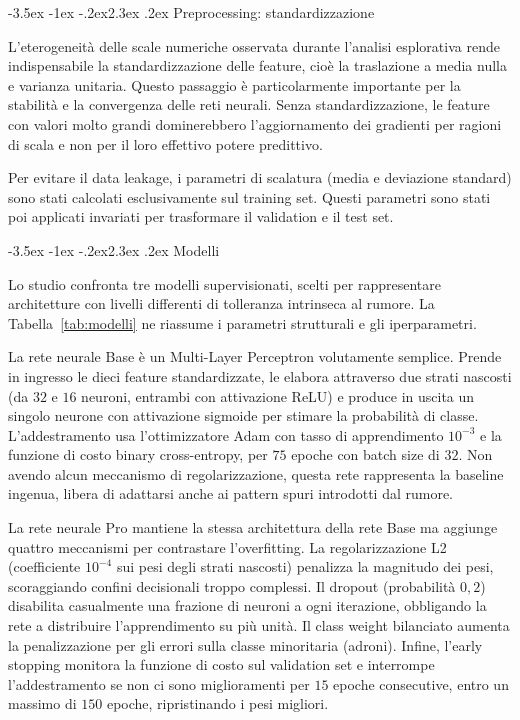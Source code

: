 \documentclass[12pt,a4paper]{article}
\makeatletter
\renewcommand\section{\@startsection{section}{1}{\z@}%
  {-3.5ex \@plus -1ex \@minus -.2ex}{2.3ex \@plus.2ex}%
  {\normalfont\Large\bfseries}}
\makeatother
\begin{document}
\section{Preprocessing: standardizzazione}\label{sec:prep}

L'eterogeneità delle scale numeriche osservata durante l'analisi esplorativa
rende indispensabile la standardizzazione delle feature, cioè la traslazione a
media nulla e varianza unitaria. Questo passaggio è particolarmente importante
per la stabilità e la convergenza delle reti neurali. Senza standardizzazione,
le feature con valori molto grandi dominerebbero l'aggiornamento dei gradienti
per ragioni di scala e non per il loro effettivo potere predittivo.

Per evitare il data leakage, i parametri di scalatura (media e deviazione
standard) sono stati calcolati esclusivamente sul training set. Questi parametri
sono stati poi applicati invariati per trasformare il validation e il test set.

\section{Modelli}\label{sec:modelli}

Lo studio confronta tre modelli supervisionati, scelti per rappresentare
architetture con livelli differenti di tolleranza intrinseca al rumore. La
Tabella~\ref{tab:modelli} ne riassume i parametri strutturali e gli
iperparametri.

La rete neurale Base è un Multi-Layer Perceptron volutamente semplice. Prende in
ingresso le dieci feature standardizzate, le elabora attraverso due strati
nascosti (da $32$ e $16$ neuroni, entrambi con attivazione ReLU) e produce in
uscita un singolo neurone con attivazione sigmoide per stimare la probabilità di
classe. L'addestramento usa l'ottimizzatore Adam con tasso di apprendimento
$10^{-3}$ e la funzione di costo binary cross-entropy, per $75$ epoche con batch
size di $32$. Non avendo alcun meccanismo di regolarizzazione, questa rete
rappresenta la baseline ingenua, libera di adattarsi anche ai pattern spuri
introdotti dal rumore.

La rete neurale Pro mantiene la stessa architettura della rete Base ma aggiunge
quattro meccanismi per contrastare l'overfitting. La regolarizzazione L2
(coefficiente $10^{-4}$ sui pesi degli strati nascosti) penalizza la magnitudo
dei pesi, scoraggiando confini decisionali troppo complessi. Il dropout
(probabilità $0{,}2$) disabilita casualmente una frazione di neuroni a ogni
iterazione, obbligando la rete a distribuire l'apprendimento su più unità. Il
class weight bilanciato aumenta la penalizzazione per gli errori sulla classe
minoritaria (adroni). Infine, l'early stopping monitora la funzione di costo sul
validation set e interrompe l'addestramento se non ci sono miglioramenti per
$15$ epoche consecutive, entro un massimo di $150$ epoche, ripristinando i pesi
migliori.
\end{document}
